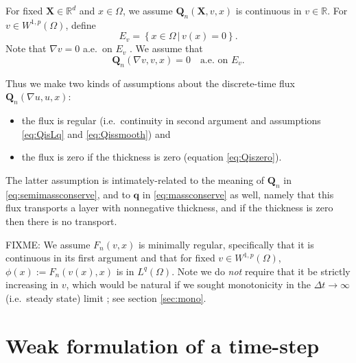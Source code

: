 \documentclass[final,leqno,onefignum,onetabnum]{siamltex1213bueler}
\newcommand\bq{\mathbf{q}}
\newcommand\bQ{\mathbf{Q}}
\newcommand\bX{\mathbf{X}}
\renewcommand{\grad}{\nabla}
\newcommand\RR{\mathbb{R}}
\begin{document}
For fixed $\bX\in\RR^d$ and $x\in \Omega$, we assume $\bQ_n(\bX,v,x)$ is continuous in $v\in\RR$.  For $v \in W^{1,p}(\Omega)$, define
    $$E_v = \left\{x\in\Omega \,\big|\, v(x) = 0\right\}.$$
Note that $\grad v = 0$ a.e.~on $E_v$ \cite[lemma A.4 of chapter II]{KinderlehrerStampacchia}.  We assume that
\begin{equation}
\bQ_n(\grad v,v,x)=0 \quad \text{a.e.~on } E_v. \label{eq:Qiszero}
\end{equation}

Thus we make two kinds of assumptions about the discrete-time flux $\bQ_n(\grad u,u,x)$: \begin{itemize}
\item the flux is regular (i.e.~continuity in second argument and assumptions \eqref{eq:QisLq} and \eqref{eq:Qissmooth}) and
\item the flux is zero if the thickness is zero (equation \eqref{eq:Qiszero}).
\end{itemize}
The latter assumption is intimately-related to the meaning of $\bQ_n$ in \eqref{eq:semimassconserve}, and to $\bq$ in \eqref{eq:massconserve} as well, namely that this flux transports a layer with nonnegative thickness, and if the thickness is zero then there is no transport.

FIXME: We assume $F_n(v,x)$ is minimally regular, specifically that it is continuous in its first argument and that for fixed $v\in W^{1,p}(\Omega)$, $\phi(x) := F_n(v(x),x)$ is in $L^q(\Omega)$.  Note we do \emph{not} require that it be strictly increasing in $v$, which would be natural if we sought monotonicity in the $\Delta t \to \infty$ (i.e.~steady state) limit \cite{JouvetBueler2012}; see section \ref{sec:mono}.


\section{Weak formulation of a time-step}  \label{sec:weakform}
\end{document}
